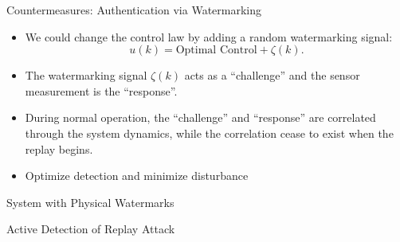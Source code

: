 \documentclass[10pt]{beamer}
\newlength\figureheight
\newlength\figurewidth
\newcommand{\tikzdir}[1]{#1.tikz}
\newcommand{\inputtikz}[1]{}}
\begin{document}
\begin{frame}{Countermeasures: Authentication via Watermarking}
  \begin{itemize}
    \item We could change the control law by adding a random watermarking signal:
      \begin{displaymath}
	u(k) = \text{Optimal Control}+ \zeta(k).
      \end{displaymath}
    \item The watermarking signal $\zeta(k)$ acts as a ``challenge'' and the sensor measurement is the ``response''. 
    \item During normal operation, the ``challenge'' and ``response'' are correlated through the system dynamics, while the correlation cease to exist when the replay begins.
    \item Optimize detection and minimize disturbance
  \end{itemize}
\end{frame}

\begin{frame}{System with Physical Watermarks}
  \begin{figure}[htpb]
    \begin{center}
      \inputtikz{replaywithphywatermark}
    \end{center}
  \end{figure}
\end{frame}

\begin{frame}{Active Detection of Replay Attack}
  \setlength{\figureheight}{6cm}
  \setlength{\figurewidth}{7cm}
  \begin{figure}[htpb]
    \begin{center}
      \inputtikz{replay1}
    \end{center}
  \end{figure}
\end{frame}
\end{document}
